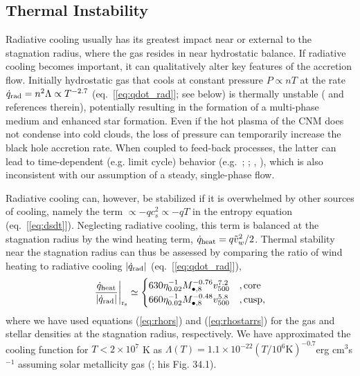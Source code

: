 \documentclass[usenatbib,fleqn]{mn2e}
\begin{document}
\subsection{Thermal Instability}
\label{sec:instability}

Radiative cooling usually has its greatest impact near or external to
the stagnation radius, where the gas resides in near hydrostatic
balance.  If radiative cooling becomes important, it can qualitatively
alter key features of the accretion flow. Initially hydrostatic gas
that cools at constant pressure $P \propto nT$ at the rate
$\dot{q}_{\rm rad} = n^{2}\Lambda \propto T^{-2.7}$
(eq.~[\ref{eq:qdot_rad}]; see below) is thermally unstable
(\citealt{McCourt+12} and references therein), potentially resulting
in the formation of a multi-phase medium and enhanced star formation.
Even if the hot plasma of the CNM does not condense into cold clouds,
the loss of pressure can temporarily increase the black hole accretion
rate.  When coupled to feed-back processes, the latter can lead to
time-dependent (e.g. limit cycle) behavior
(e.g.~\citealt{Ciotti&Ostriker07}; \citealt{Ciotti+10};
\citealt{Yuan&Li11}, \citealt{Gan+14}), which is also inconsistent
with our assumption of a steady, single-phase flow.

Radiative cooling can, however, be stabilized if it is overwhelmed by
other sources of cooling, namely the term $\propto -q c_{s}^{2}
\propto -qT$ in the entropy equation (eq.~[\ref{eq:dsdt}]).
Neglecting radiative cooling, this term is balanced at the stagnation
radius by the wind heating term, $\dot{q}_{\rm heat} = q
\tilde{v}_{w}^{2}/2$.  Thermal stability near the stagnation radius
can thus be assessed by comparing the ratio of wind heating to
radiative cooling $|\dot{q}_{\rm rad}|$ (eq.~[\ref{eq:qdot_rad}]),
\begin{align}
\left.\frac{\dot{q}_{\rm heat}}{|\dot{q}_{\rm rad}|}\right|_{\rm r_{\rm s}} \simeq
  \begin{cases}
   630 \eta_{0.02}^{-1} M_{\bullet,8}^{-0.76}v_{500}^{7.2}  &, \text{core}\\
   660 \eta_{0.02}^{-1} M_{\bullet,8}^{-0.48}v_{500}^{5.8}  &, \text{cusp},     
  \end{cases}
  \label{eq:cooling2}
\end{align}
where we have used equations (\ref{eq:rhors}) and (\ref{eq:rhostarrs})
for the gas and stellar densities at the stagnation radius,
respectively.  We have approximated the cooling function for $T <
2\times 10^{7}$ K as $\Lambda(T) = 1.1 \times 10^{-22} \left(T/10^6
  \text{K}\right)^{-0.7} $erg cm$^3 $s$^{-1}$ assuming solar
metallicity gas (\citealt{Draine:2011a}; his Fig. 34.1).
\end{document}
